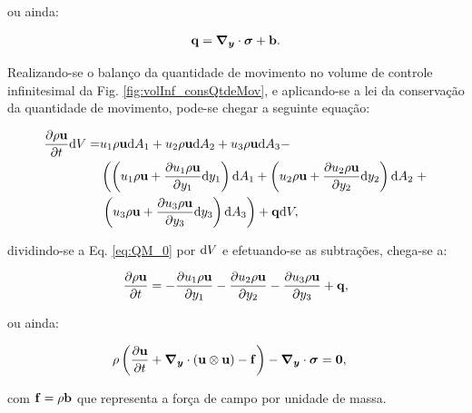 \documentclass[tese_patricia]{subfiles}%
\begin{document}
\noindent ou ainda:

\begin{align}
	\mathbf{q} = \boldsymbol{\nabla_y} \cdot \boldsymbol{\sigma} + \mathbf{b}.
\end{align}


Realizando-se o balanço da quantidade de movimento no volume de controle infinitesimal da Fig. \ref{fig:volInf_consQtdeMov}, e aplicando-se a lei da conservação da quantidade de movimento, pode-se chegar a seguinte equação:


\begin{align}
	\begin{split}
	\frac{\partial \rho \mathbf{u}}{\partial t}\mathrm{d} V =& u_1\rho \mathbf{u} \mathrm{d} A_1 + u_2\rho \mathbf{u} \mathrm{d} A_2 + u_3 \rho \mathbf{u} \mathrm{d} A_3 - \\
	 & \left(\left(u_1 \rho \mathbf{u} + \frac{\partial u_1 \rho \mathbf{u}}{\partial y_1}\mathrm{d} y_1 \right)\mathrm{d} A_1 + \left(u_2 \rho \mathbf{u} + \frac{\partial u_2 \rho \mathbf{u}}{\partial y_2}\mathrm{d} y_2 \right)\mathrm{d} A_2 \right. + \\ & \left.   \left(u_3 \rho \mathbf{u} + \frac{\partial u_3 \rho \mathbf{u}}{\partial y_3}\mathrm{d} y_3 \right)\mathrm{d} A_3\right) + \mathbf{q} \mathrm{d} V,
	\label{eq:QM_0} 
	\end{split}
\end{align}	

\noindent dividindo-se a Eq. \ref{eq:QM_0} por $\mathrm{d} V$ e efetuando-se as subtrações, chega-se a:

\begin{align}
		\frac{\partial \rho \mathbf{u}}{\partial t} = 
		-\frac{\partial u_1 \rho \mathbf{u}}{\partial y_1} 
		-\frac{\partial u_2 \rho \mathbf{u}}{\partial y_2}  
		-\frac{\partial u_3 \rho \mathbf{u}}{\partial y_3} + \mathbf{q},
		\label{eq:QM_1} 
\end{align}

ou ainda:

\begin{align}
	\rho\left(\frac{\partial\mathbf{u}}{\partial t} + \boldsymbol{\nabla_y} \cdot \left(\mathbf{u}\otimes\mathbf{u}\right) - \mathbf{f} \right) - \boldsymbol{\nabla_y} \cdot \boldsymbol{\sigma}  &= \mathbf{0}, \label{eq:QM_2} 
\end{align}

\noindent com $\mathbf{f} = \rho \mathbf{b}$ que representa a força de campo por unidade de massa.
\end{document}
